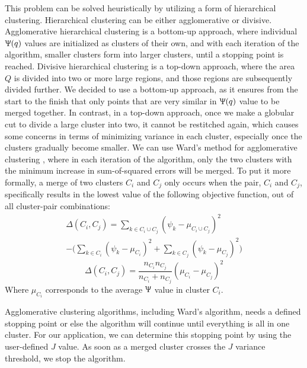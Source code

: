 \documentclass[conference]{IEEEtran}
\theoremstyle{plain}%
\begin{document}
This problem can be solved heuristically by utilizing a form of hierarchical clustering. Hierarchical clustering can be either agglomerative or divisive. Agglomerative hierarchical clustering is a bottom-up approach, where individual $\Uppsi(q)$ values are initialized as clusters of their own, and with each iteration of the algorithm, smaller clusters form into larger clusters, until a stopping point is reached. Divisive hierarchical clustering is a top-down approach, where the area $Q$ is divided into two or more large regions, and those regions are subsequently divided further. We decided to use a bottom-up approach, as it ensures from the start to the finish that only points that are very similar in $\Uppsi(q)$ value to be merged together. In contrast, in a top-down approach, once we make a globular cut to divide a large cluster into two, it cannot be restitched again, which causes some concerns in terms of minimizing variance in each cluster, especially once the clusters gradually become smaller. We can use Ward's method for agglomerative clustering \cite{ward1963hierarchical}, where in each iteration of the algorithm, only the two clusters with the minimum increase in sum-of-squared errors will be merged. To put it more formally, a merge of two clusters $C_i$ and $C_j$ only occurs when the pair, $C_i$ and $C_j$, specifically results in the lowest value of the following objective function, out of all cluster-pair combinations:
\begin{multline} \label{eq:ward_formula}
\Delta(C_i,C_j) = \sum_{k \in C_i \cup C_j} ( \psi_k - \mu_{C_i \cup C_j} )^2 \\
 - \Big( \sum_{k \in C_i} ( \psi_k - \mu_{C_i} )^2 + \sum_{k \in C_j} ( \psi_k - \mu_{C_j} )^2 \Big)
\end{multline}
\begin{equation}
\Delta(C_i,C_j) = \frac{n_{C_i}n_{C_j}}{n_{C_i} + n_{C_j}} (\mu_{C_i} - \mu_{C_j})^2
\end{equation}
Where $\mu_{C_i}$ corresponds to the average $\Uppsi$ value in cluster $C_i$.

Agglomerative clustering algorithms, including Ward's algorithm, needs a defined stopping point or else the algorithm will continue until everything is all in one cluster. For our application, we can determine this stopping point by using the user-defined $J$ value. As soon as a merged cluster crosses the $J$ variance threshold, we stop the algorithm.
\end{document}
